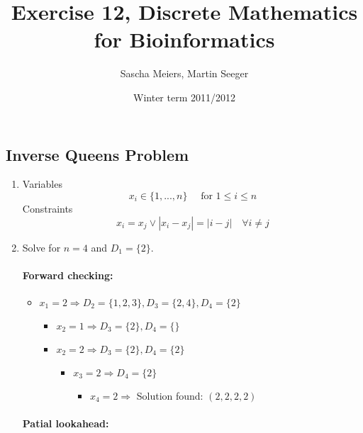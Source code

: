 \documentclass[a4paper, oneside]{scrartcl}
\author{Sascha Meiers, Martin Seeger}
\title{Exercise 12, Discrete Mathematics for Bioinformatics}
\date{Winter term 2011/2012}
\begin{document}
\maketitle


\subsection{Inverse Queens Problem}

\renewcommand{\labelenumi}{\alph{enumi})}
\begin{enumerate}
  \item 
  Variables
    \[x_i \in \{1,...,n\} \quad \text{ for } 1 \leq i \leq n \]
  Constraints
    \[ x_i = x_j  \vee |x_i -x_j| = |i-j| \quad  \forall i\neq j \]
    
  \item
  Solve for $n=4$ and $D_1 = \{2\}$.
  
  \paragraph{Forward checking:}
  
  \begin{itemize} 
  \renewcommand{\labelitemi}{$\bullet$}
  \renewcommand{\labelitemii}{$\bullet$}
  \renewcommand{\labelitemiii}{$\bullet$}
  \renewcommand{\labelitemiv}{$\bullet$}
        \item $x_1 = 2 \Rightarrow D_2 = \{1,2,3\}, D_3 = \{2,4\}, D_4 = \{2\}$
        \begin{itemize}
            \item $x_2 = 1 \Rightarrow D_3 = \{2\}, D_4 = \{\}$
            \item $x_2 = 2 \Rightarrow D_3 = \{2\}, D_4 = \{2\}$
            \begin{itemize}
                \item $x_3 = 2 \Rightarrow D_4 = \{2\}$
                \begin{itemize}
                    \item $x_4 = 2 \Rightarrow$ Solution found: $(2,2,2,2)$
                \end{itemize}
            \end{itemize}
        \end{itemize}
  \end{itemize}
  

  \paragraph{Patial lookahead:}
  

\end{enumerate}
\end{document}
